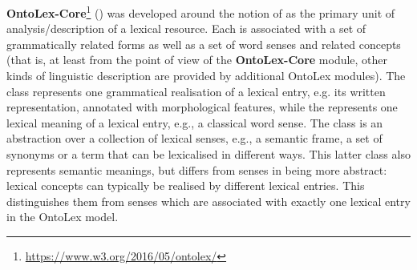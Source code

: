 \documentclass[output=paper,colorlinks,citecolor=brown]{langscibook}
\begin{document}
\textbf{OntoLex-Core}\footnote{\url{https://www.w3.org/2016/05/ontolex/}} () was developed around the notion of
 as the primary unit of analysis/description of a lexical resource.
Each  is associated with a set of grammatically related forms as well as a set of word senses and related concepts (that is, at least from the point of view of the \textbf{OntoLex-Core} module, other kinds of linguistic description are provided by additional OntoLex modules). The  class represents one grammatical realisation of a lexical entry, e.g. its written representation, annotated with morphological features,
while the 
represents one lexical meaning of a lexical entry, e.g., a classical word sense. The  class
is an abstraction over a collection of lexical senses, e.g., a semantic frame, a set of synonyms or a term that can be lexicalised in different ways.
This latter class also represents semantic meanings, but differs from senses in being more abstract: lexical concepts can typically be realised by different lexical entries. This distinguishes them from senses which are associated with exactly one lexical entry in the OntoLex model.
\end{document}
